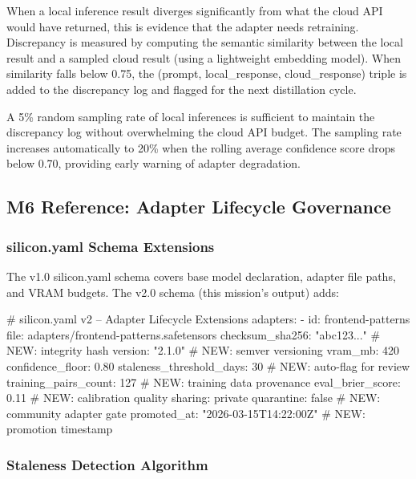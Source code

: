 \documentclass[11pt,letterpaper]{article}
\begin{document}
When a local inference result diverges significantly from what the cloud API would have returned, this is evidence that the adapter needs retraining. Discrepancy is measured by computing the semantic similarity between the local result and a sampled cloud result (using a lightweight embedding model). When similarity falls below 0.75, the (prompt, local\_response, cloud\_response) triple is added to the discrepancy log and flagged for the next distillation cycle.

A 5\% random sampling rate of local inferences is sufficient to maintain the discrepancy log without overwhelming the cloud API budget. The sampling rate increases automatically to 20\% when the rolling average confidence score drops below 0.70, providing early warning of adapter degradation.

\subsection{M6 Reference: Adapter Lifecycle Governance}

\subsubsection{silicon.yaml Schema Extensions}

The v1.0 silicon.yaml schema covers base model declaration, adapter file paths, and VRAM budgets. The v2.0 schema (this mission's output) adds:

\begin{asciibox}
# silicon.yaml v2 -- Adapter Lifecycle Extensions
adapters:
  - id: frontend-patterns
    file: adapters/frontend-patterns.safetensors
    checksum_sha256: "abc123..."          # NEW: integrity hash
    version: "2.1.0"                     # NEW: semver versioning
    vram_mb: 420
    confidence_floor: 0.80
    staleness_threshold_days: 30         # NEW: auto-flag for review
    training_pairs_count: 127            # NEW: training data provenance
    eval_brier_score: 0.11               # NEW: calibration quality
    sharing: private
    quarantine: false                    # NEW: community adapter gate
    promoted_at: "2026-03-15T14:22:00Z" # NEW: promotion timestamp
\end{asciibox}

\subsubsection{Staleness Detection Algorithm}
\end{document}
